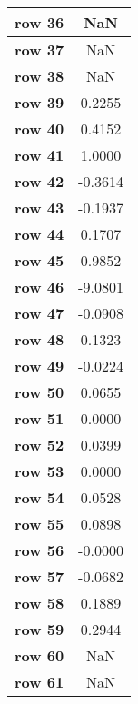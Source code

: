 \begin{tiny}
\begin{tabular}{|l|c|}
\textbf{row 36}&NaN\\\hline
\textbf{row 37}&NaN\\\hline
\textbf{row 38}&NaN\\\hline
\textbf{row 39}&0.2255\\\hline
\textbf{row 40}&0.4152\\\hline
\textbf{row 41}&1.0000\\\hline
\textbf{row 42}&-0.3614\\\hline
\textbf{row 43}&-0.1937\\\hline
\textbf{row 44}&0.1707\\\hline
\textbf{row 45}&0.9852\\\hline
\textbf{row 46}&-9.0801\\\hline
\textbf{row 47}&-0.0908\\\hline
\textbf{row 48}&0.1323\\\hline
\textbf{row 49}&-0.0224\\\hline
\textbf{row 50}&0.0655\\\hline
\textbf{row 51}&0.0000\\\hline
\textbf{row 52}&0.0399\\\hline
\textbf{row 53}&0.0000\\\hline
\textbf{row 54}&0.0528\\\hline
\textbf{row 55}&0.0898\\\hline
\textbf{row 56}&-0.0000\\\hline
\textbf{row 57}&-0.0682\\\hline
\textbf{row 58}&0.1889\\\hline
\textbf{row 59}&0.2944\\\hline
\textbf{row 60}&NaN\\\hline
\textbf{row 61}&NaN\\\hline
\end{tabular}
\end{tiny}